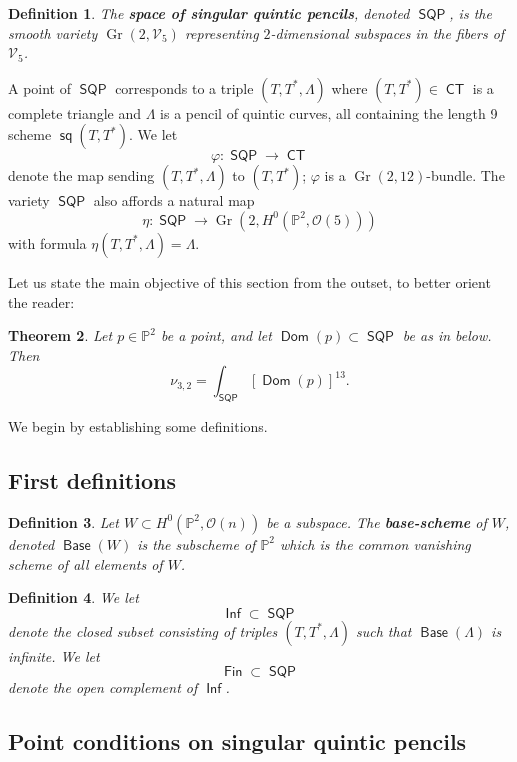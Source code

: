 \documentclass[reqno, 11pt]{amsart}
\theoremstyle{plain}
\newtheorem{theorem}{Theorem}[section]
\newtheorem{definition}[theorem]{Definition}
\theoremstyle{remark}
\renewcommand{\P}{\mathbb{P}}
\renewcommand{\O}{\mathcal{O}}
\DeclareMathOperator{\CT}{\mathsf{CT}}
\DeclareMathOperator{\SQP}{\mathsf{SQP}}
\DeclareMathOperator{\Gr}{Gr}
\DeclareMathOperator{\s}{\mathsf{sq}}
\DeclareMathOperator{\Dom}{\mathsf{Dom}}
\DeclareMathOperator{\Inf}{\mathsf{Inf}}
\DeclareMathOperator{\Fin}{\mathsf{Fin}}
\DeclareMathOperator{\Base}{\mathsf{Base}}
\begin{document}
\begin{definition}
  \label{definition:quinticsingularpencils} The {\bf space of singular quintic pencils}, denoted  $\SQP$, is the
  smooth variety $\Gr(2,\mathcal{V}_{5})$ representing $2$-dimensional subspaces in the fibers of $\mathcal{V}_{5}$.
\end{definition} 
A point of $\SQP$ corresponds to a triple $(T, T^{*}, \Lambda)$
where $(T,T^{*}) \in \CT$ is a complete triangle and $\Lambda$ is a
pencil of quintic curves, all containing the length 9 scheme
$\s(T,T^{*})$. We let \[\varphi: \SQP \to \CT\] denote the map sending
$(T,T^{*},\Lambda)$ to $(T,T^{*})$;  $\varphi$ is a $\Gr(2,12)$-bundle.  The variety $\SQP$ also affords a natural map
\[\eta: \SQP \to \Gr\left(2, H^{0}(\P^{2}, \O(5))\right)\]
with formula $\eta(T,T^{*},\Lambda) = \Lambda$. 

Let us state the main objective of this section from the outset, to better orient the reader: 

\begin{theorem}
    \label{theorem:Domintegral} Let $p \in \P^{2}$ be a point, and let $\Dom(p) \subset \SQP$ be as in  below. Then $$\nu_{3,2} = \int_{\SQP} \left[\Dom(p)\right]^{13}.$$
\end{theorem}
We begin by establishing some definitions.


\subsection{First definitions}



\begin{definition}
    \label{definition:base} Let $W \subset H^{0}(\P^{2},\O(n))$ be a subspace. The {\bf base-scheme} of $W$, denoted $\Base(W)$ is the subscheme of $\P^{2}$ which is the common vanishing scheme of all elements of $W$.
\end{definition}


\begin{definition}
  \label{definition:finite} We let \[\Inf \subset \SQP\] denote the
  closed subset consisting of triples $(T,T^{*},\Lambda)$ such that $\Base(\Lambda)$ is infinite. We let
  \[\Fin \subset \SQP\] denote the open complement of $\Inf$.
\end{definition}


\subsection{Point conditions on singular quintic pencils}
\label{sec:pointconditionSQP}
\end{document}
